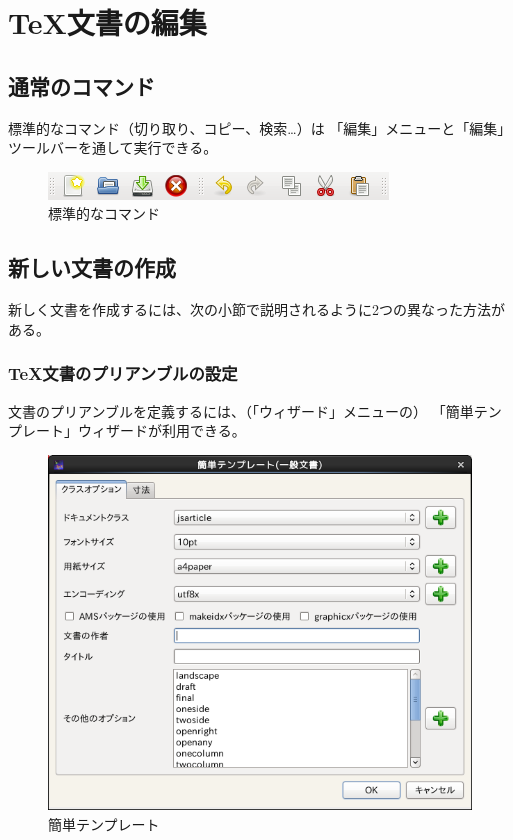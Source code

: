 \chapter{TeX文書の編集}

\section{通常のコマンド}

標準的なコマンド（切り取り、コピー、検索…）は
「編集」メニューと「編集」ツールバーを通して実行できる。

\begin{figure}[H]
  \centering
  \includegraphics{doc1.png}
  \caption{標準的なコマンド}
\end{figure}

\section{新しい文書の作成}
新しく文書を作成するには、次の小節で説明されるように2つの異なった方法がある。

\subsection{TeX文書のプリアンブルの設定}

文書のプリアンブルを定義するには、（「ウィザード」メニューの）
「簡単テンプレート」ウィザードが利用できる。

\begin{figure}[H]
  \centering
  \includegraphics[width=.8\linewidth]{doc2.png}
  \caption{簡単テンプレート}
\end{figure}

